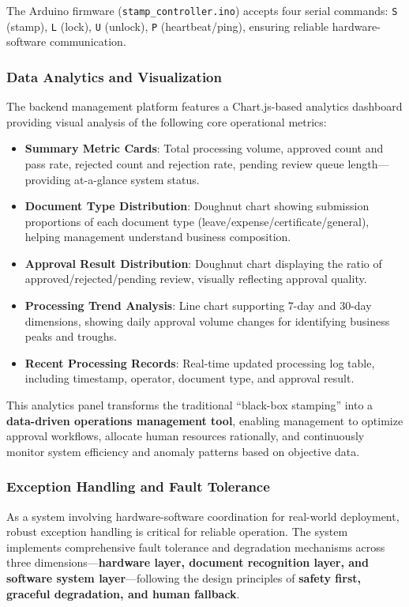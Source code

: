 \documentclass[conference]{IEEEtran}
\begin{document}
\noindent The Arduino firmware (\texttt{stamp\_controller.ino}) accepts four serial commands: \texttt{S} (stamp), \texttt{L} (lock), \texttt{U} (unlock), \texttt{P} (heartbeat/ping), ensuring reliable hardware-software communication.

\subsubsection{Data Analytics and Visualization}

The backend management platform features a Chart.js-based analytics dashboard providing visual analysis of the following core operational metrics:

\begin{itemize}[leftmargin=*]
    \item \textbf{Summary Metric Cards}: Total processing volume, approved count and pass rate, rejected count and rejection rate, pending review queue length---providing at-a-glance system status.
    \item \textbf{Document Type Distribution}: Doughnut chart showing submission proportions of each document type (leave/expense/certificate/general), helping management understand business composition.
    \item \textbf{Approval Result Distribution}: Doughnut chart displaying the ratio of approved/rejected/pending review, visually reflecting approval quality.
    \item \textbf{Processing Trend Analysis}: Line chart supporting 7-day and 30-day dimensions, showing daily approval volume changes for identifying business peaks and troughs.
    \item \textbf{Recent Processing Records}: Real-time updated processing log table, including timestamp, operator, document type, and approval result.
\end{itemize}

\noindent This analytics panel transforms the traditional ``black-box stamping'' into a \textbf{data-driven operations management tool}, enabling management to optimize approval workflows, allocate human resources rationally, and continuously monitor system efficiency and anomaly patterns based on objective data.

\subsubsection{Exception Handling and Fault Tolerance}

As a system involving hardware-software coordination for real-world deployment, robust exception handling is critical for reliable operation. The system implements comprehensive fault tolerance and degradation mechanisms across three dimensions---\textbf{hardware layer, document recognition layer, and software system layer}---following the design principles of \textbf{safety first, graceful degradation, and human fallback}.
\end{document}

